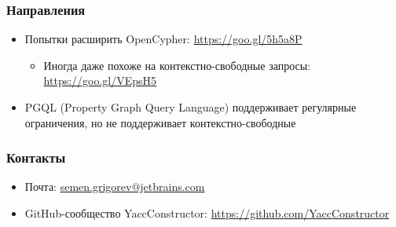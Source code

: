 \documentclass[xcolor=table,aspectratio=169]{beamer}
\begin{document}
\begin{frame}
  \transwipe[direction=90]
  \frametitle{Направления}

\begin{itemize} 
\item Попытки расширить OpenCypher: \url{https://goo.gl/5h5a8P}
\begin{itemize} 
\item Иногда даже похоже на контекстно-свободные запросы: \url{https://goo.gl/VEpsH5} 
\end{itemize}

\item PGQL (Property Graph Query Language) поддерживает регулярные ограничения, но не поддерживает контекстно-свободные

\end{itemize}

\end{frame}

            
\begin{frame}
\transwipe[direction=90]
\frametitle{Контакты}
\begin{itemize}
  \item Почта: \url{semen.grigorev@jetbrains.com}
  \item GitHub-сообщество YaccConstructor: \url{https://github.com/YaccConstructor}
\end{itemize}
\end{frame}
\end{document}
